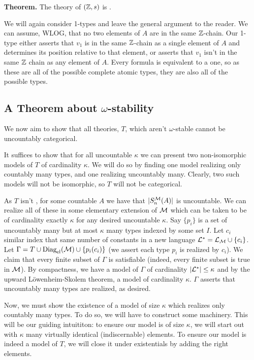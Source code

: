 \textbf{Theorem.} The theory of \((\mathbb{Z}, s)\) is \omst. 

We will again consider 1-types and leave the general argument to the reader. 
We can assume, WLOG, that no two elements of \(A\) are in the same \(\mathbb{Z}\)-chain. 
Our 1-type either asserts that \(v_1\) is in the same \(\mathbb{Z}\)-chain as a single element of \(A\) and determines its position relative to that element, or asserts that \(v_1\) isn't in the same \(\mathbb{Z}\) chain as any element of \(A\). 
Every formula is equivalent to a \qf one, so as these are all of the possible complete atomic types, they are also all of the possible types.    

\subsection{A Theorem about \(\omega\)-stability}

We now aim to show that all theories, \(T\), which aren't \(\omega\)-stable cannot be uncountably categorical.

It suffices to show that for all uncountable \(\kappa\) we can present two non-isomorphic models of \(T\) of cardinality \(\kappa\). 
We will do so by finding one model realizing only countably many types, and one realizing uncountably many. 
Clearly, two such models will not be isomorphic, so \(T\) will not be categorical. 

As \(T\) isn't \omst, for some countable \(A\) we have that \(|S_n^{\mathcal{M}}(A)|\) is uncountable. 
We can realize all of these in some elementary extension of \(\mathcal{M}\) which can be taken to be of cardinality exactly \(\kappa\) for any desired uncountable \(\kappa\). 
Say \(\{p_i\}\) is a set of uncountably many but at most \(\kappa\) many types indexed by some set \(I\). 
Let \(c_i\) similar index that same number of constants in a new language \(\mathcal{L}^* = \mathcal{L}_{\mathcal{M}} \cup \{c_i\}\). 
Let \(\Gamma = T \cup \text{Diag}_\text{el}(\mathcal{M}) \cup \{p_i(c_i)\}\) (we assert each type \(p_i\) is realized by \(c_i\)). 
We claim that every finite subset of \(\Gamma\) is satisfiable (indeed, every finite subset is true in \(\mathcal{M}\)).
By compactness, we have a model of \(\Gamma\) of cardinality \(|\mathcal{L}^*| \leq \kappa\) and by the upward L\"owenheim-Skolem theorem, a model of cardinality \(\kappa\).
\(\Gamma\) asserts that uncountably many types are realized, as desired. 

Now, we must show the existence of a model of size \(\kappa\) which realizes only countably many types. To do so, we will have to construct some machinery.
This will be our guiding intuititon: to ensure our model is of size \(\kappa\), we will start out with \(\kappa\) many virtually identical (indiscernable) elements. 
To ensure our model is indeed a model of \(T\), we will close it under existentials by adding the right elements. 

